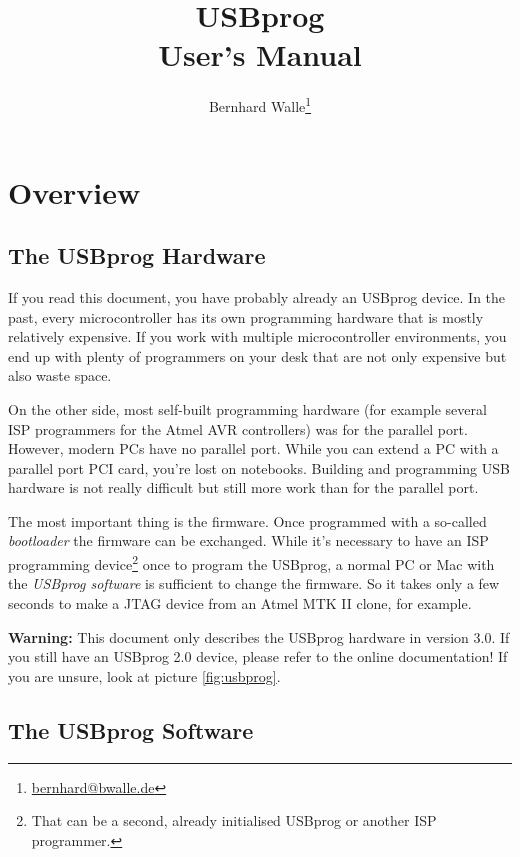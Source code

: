 \documentclass[bibtotoc,UKenglish,halfparskip,oneside,DIV12]{scrreprt}
\begin{document}
\title{USBprog \\ User's Manual}
\author{Bernhard Walle\footnote{\url{bernhard@bwalle.de}}}
\maketitle
\tableofcontents

\chapter{Overview}

\section{The USBprog Hardware}

If you read this document, you have probably already an USBprog device. In the past, every
microcontroller has its own programming hardware that is mostly relatively expensive. If you work
with multiple microcontroller environments, you end up with plenty of programmers on your desk that
are not only expensive but also waste space.

On the other side, most self-built programming hardware (for example several ISP programmers for the
Atmel AVR controllers) was for the parallel port. However, modern PCs have no parallel port. While
you can extend a PC with a parallel port PCI card, you're lost on notebooks. Building and
programming USB hardware is not really difficult but still more work than for the parallel port.

The most important thing is the firmware. Once programmed with a so-called \emph{bootloader} the
firmware can be exchanged. While it's necessary to have an ISP programming device\footnote{That can
be a second, already initialised USBprog or another ISP programmer.} once to program the USBprog, a
normal PC or Mac with the \emph{USBprog software} is sufficient to change the firmware. So it takes
only a few seconds to make a JTAG device from an Atmel MTK II clone, for example.

\textbf{Warning:} This document only describes the USBprog hardware in version 3.0. If you still
have an USBprog 2.0 device, please refer to the online documentation! If you are unsure, look at
picture \vref{fig:usbprog}.

\section{The USBprog Software}
\end{document}
